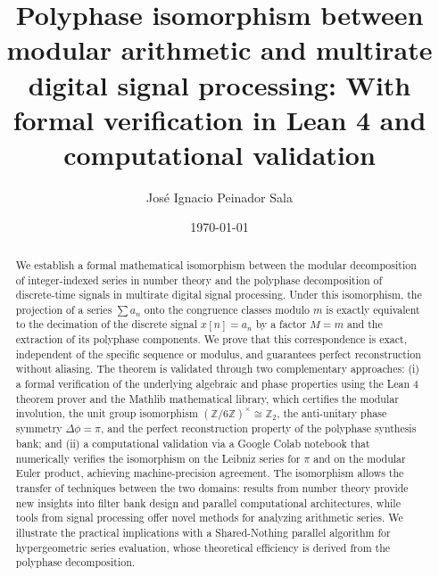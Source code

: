 \documentclass{mcom-l} %
\theoremstyle{plain} %
\theoremstyle{definition} %
\theoremstyle{remark} %
\begin{document}

\title[Polyphase Isomorphism]{Polyphase isomorphism between modular arithmetic and multirate digital signal processing: With formal verification in Lean 4 and computational validation}

\author{José Ignacio Peinador Sala}
\address{Independent Researcher, Valladolid, Spain}

\date{\today}



\begin{abstract}
We establish a formal mathematical isomorphism between the modular decomposition of integer-indexed series in number theory and the polyphase decomposition of discrete-time signals in multirate digital signal processing. Under this isomorphism, the projection of a series \(\sum a_n\) onto the congruence classes modulo \(m\) is exactly equivalent to the decimation of the discrete signal \(x[n] = a_n\) by a factor \(M=m\) and the extraction of its polyphase components. We prove that this correspondence is exact, independent of the specific sequence or modulus, and guarantees perfect reconstruction without aliasing. The theorem is validated through two complementary approaches: (i) a formal verification of the underlying algebraic and phase properties using the Lean 4 theorem prover and the Mathlib mathematical library, which certifies the modular involution, the unit group isomorphism \((\mathbb{Z}/6\mathbb{Z})^{\times} \cong \mathbb{Z}_2\), the anti-unitary phase symmetry \(\Delta\phi = \pi\), and the perfect reconstruction property of the polyphase synthesis bank; and (ii) a computational validation via a Google Colab notebook that numerically verifies the isomorphism on the Leibniz series for \(\pi\) and on the modular Euler product, achieving machine-precision agreement. The isomorphism allows the transfer of techniques between the two domains: results from number theory provide new insights into filter bank design and parallel computational architectures, while tools from signal processing offer novel methods for analyzing arithmetic series. We illustrate the practical implications with a Shared-Nothing parallel algorithm for hypergeometric series evaluation, whose theoretical efficiency is derived from the polyphase decomposition.
\end{abstract}
\end{document}
